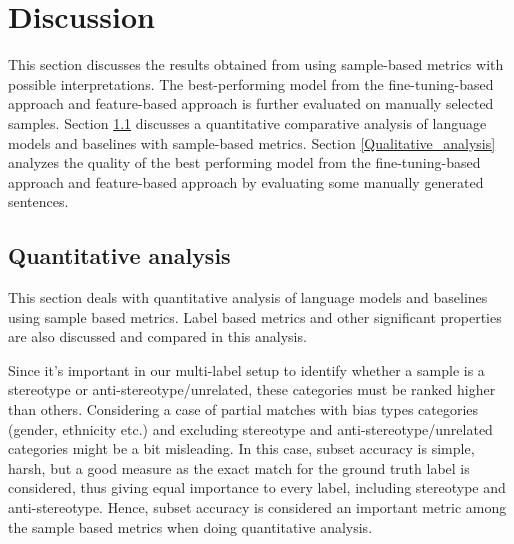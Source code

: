 \chapter{Discussion}

This section discusses the results obtained from using sample-based metrics with possible interpretations. The best-performing model from the fine-tuning-based approach and feature-based approach is further evaluated on manually selected samples. Section \ref{quantitative_analysis} discusses a quantitative comparative analysis of language models and baselines with sample-based metrics. Section \ref{Qualitative_analysis} analyzes the quality of the best performing model from the fine-tuning-based approach and feature-based approach by evaluating some manually generated sentences.


\section{Quantitative analysis} \label{quantitative_analysis}
This section deals with quantitative analysis of language models and baselines using sample based metrics. Label based metrics and other significant properties are also discussed and compared in this analysis. 


Since it's important in our multi-label setup to identify whether a sample is a stereotype or anti-stereotype/unrelated, these categories must be ranked higher than others. Considering a case of partial matches with bias types categories (gender, ethnicity etc.) and excluding stereotype and anti-stereotype/unrelated categories might be a bit misleading. In this case, subset accuracy is simple, harsh, but a good measure as the exact match for the ground truth label is considered, thus giving equal importance to every label, including stereotype and anti-stereotype. Hence, subset accuracy is considered an important metric among the sample based metrics when doing quantitative analysis.

